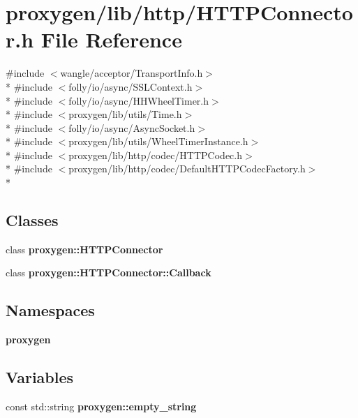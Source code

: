 \section{proxygen/lib/http/\+H\+T\+T\+P\+Connector.h File Reference}
\label{HTTPConnector_8h}
{\ttfamily \#include $<$wangle/acceptor/\+Transport\+Info.\+h$>$}\\*
{\ttfamily \#include $<$folly/io/async/\+S\+S\+L\+Context.\+h$>$}\\*
{\ttfamily \#include $<$folly/io/async/\+H\+H\+Wheel\+Timer.\+h$>$}\\*
{\ttfamily \#include $<$proxygen/lib/utils/\+Time.\+h$>$}\\*
{\ttfamily \#include $<$folly/io/async/\+Async\+Socket.\+h$>$}\\*
{\ttfamily \#include $<$proxygen/lib/utils/\+Wheel\+Timer\+Instance.\+h$>$}\\*
{\ttfamily \#include $<$proxygen/lib/http/codec/\+H\+T\+T\+P\+Codec.\+h$>$}\\*
{\ttfamily \#include $<$proxygen/lib/http/codec/\+Default\+H\+T\+T\+P\+Codec\+Factory.\+h$>$}\\*
\subsection*{Classes}
\begin{DoxyCompactItemize}
\item 
class {\bf proxygen\+::\+H\+T\+T\+P\+Connector}
\item 
class {\bf proxygen\+::\+H\+T\+T\+P\+Connector\+::\+Callback}
\end{DoxyCompactItemize}
\subsection*{Namespaces}
\begin{DoxyCompactItemize}
\item 
 {\bf proxygen}
\end{DoxyCompactItemize}
\subsection*{Variables}
\begin{DoxyCompactItemize}
\item 
const std\+::string {\bf proxygen\+::empty\+\_\+string}
\end{DoxyCompactItemize}
